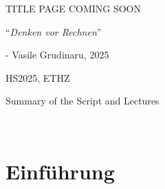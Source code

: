 \documentclass{article}
\begin{document}
\startDocument
\usetcolorboxes
\setcounter{numberingConfig}{3}
\setcounter{numberSubsections}{1}

\vspace{2cm}
\begin{Huge}
    \begin{center}
        TITLE PAGE COMING SOON
    \end{center}
\end{Huge}


\vspace{4cm}
\begin{center}
    \begin{Large}
        ``\textit{Denken vor Rechnen}''
    \end{Large}

    \hspace{3cm} - Vasile Grudinaru, 2025
\end{center}

\vspace{3cm}
\begin{center}
    HS2025, ETHZ\\[0.2cm]
    \begin{Large}
        Summary of the Script and Lectures
    \end{Large}\\[0.2cm]
\end{center}



\newpage
{}



\newsection
\section{Einführung}






\end{document}

